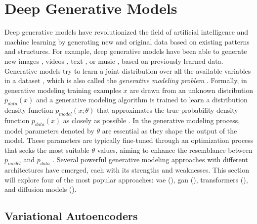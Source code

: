 \section{Deep Generative Models}
\label{ch:preliminaries-generativeMlgorithms}

Deep generative models have revolutionized the field of artificial intelligence and machine learning by generating new and original data based on existing patterns and structures.
For example, deep generative models have been able to generate new images \cite{ho2020DenoisingDiffusionProbabilistic}, videos \cite{ho2022VideoDiffusionModels}, text \cite{openai2022ChatGPTOptimizingLanguage}, or music \cite{agostinelli2023MusicLMGeneratingMusic}, based on previously learned data. 
Generative models try to learn a joint distribution over all the available variables in a dataset \cite{kingma2019IntroductionVariationalAutoencoders}, which is also called the \textit{generative modeling problem} \cite{goodfellow2020GenerativeAdversarialNetworks}.
Formally, in generative modeling training examples $x$ are drawn from an unknown distribution $p_{data}(x)$ and a generative modeling algorithm is trained to learn a distribution density function $p_{model}(x;\theta)$ that approximates the true probability density function $p_{data}(x)$ as closely as possible \cite[p. 139]{goodfellow2020GenerativeAdversarialNetworks}.
In the generative modeling process, \gls{model} parameters denoted by $\theta$ are essential as they shape the output of the \gls{model}. 
These parameters are typically fine-tuned through an optimization process that seeks the most suitable $\theta$ values, aiming to enhance the resemblance between $p_{model}$ and $p_{data}$ \cite[p. 139]{goodfellow2020GenerativeAdversarialNetworks}.
Several powerful generative modeling approaches with different architectures have emerged, each with its strengths and weaknesses. 
This section will explore four of the most popular approaches: \acrfull{vae} (), \acrfull{gan} (), transformers (), and diffusion models (). 

\subsection{Variational Autoencoders}
\label{ch:preliminaries-variationalAutoencoders} 

